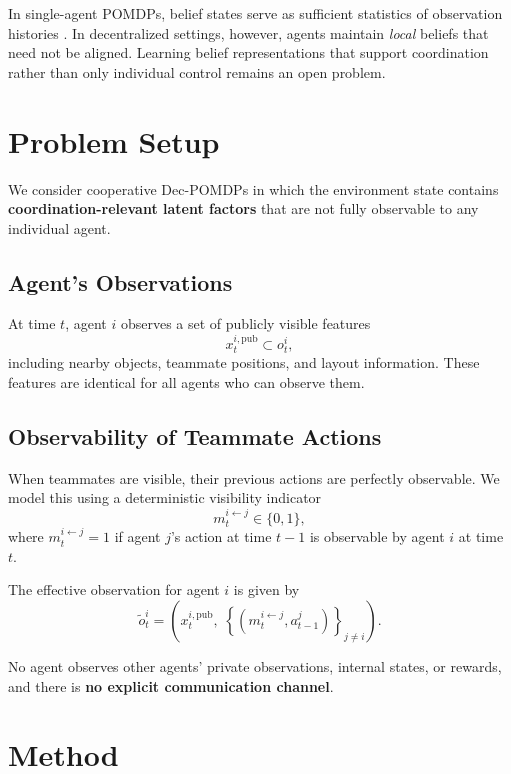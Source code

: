 \documentclass{article}
\theoremstyle{plain}
\theoremstyle{definition}
\theoremstyle{remark}
\begin{document}
In single-agent POMDPs, belief states serve as sufficient statistics of observation histories \cite{kaelbling1998planning}. In decentralized settings, however, agents maintain \textit{local} beliefs that need not be aligned. Learning belief representations that support coordination rather than only individual control remains an open problem.

\section{Problem Setup}

We consider cooperative Dec-POMDPs in which the environment state contains \textbf{coordination-relevant latent factors} that are not fully observable to any individual agent.

\subsection{Agent's Observations}

At time $t$, agent $i$ observes a set of publicly visible features
\begin{equation}
x_t^{i,\mathrm{pub}} \subset o_t^i,
\end{equation}
including nearby objects, teammate positions, and layout information. These features are identical for all agents who can observe them.

\subsection{Observability of Teammate Actions}
When teammates are visible, their previous actions are perfectly observable. We model this using a deterministic visibility indicator
\begin{equation}
m_t^{i \leftarrow j} \in \{0,1\},
\end{equation}
where $m_t^{i \leftarrow j} = 1$ if agent $j$'s action at time $t-1$ is observable by agent $i$ at time $t$.

The effective observation for agent $i$ is given by
\begin{equation}
\tilde{o}_t^i
=
\left(
x_t^{i,\mathrm{pub}},
\;
\left\{ (m_t^{i \leftarrow j}, a_{t-1}^j) \right\}_{j \neq i}
\right).
\end{equation}

No agent observes other agents’ private observations, internal states, or rewards, and there is \textbf{no explicit communication channel}.

\section{Method}
\end{document}
